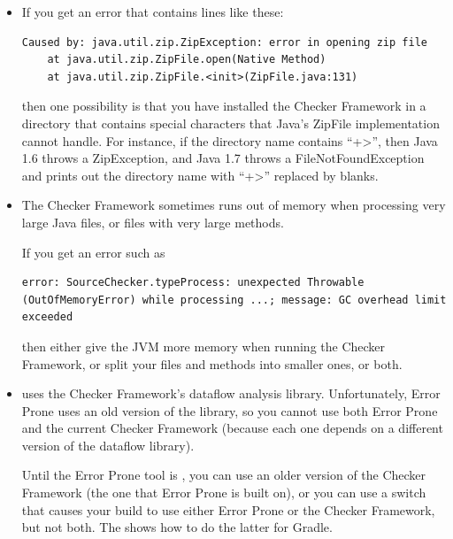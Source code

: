 \begin{itemize}
If you are building from source (Section~\ref{build-source}),
you might need to rebuild the Annotation
File Utilities before recompiling or using the Checker Framework.


\item
If you get an error that contains lines like these:

\begin{Verbatim}
Caused by: java.util.zip.ZipException: error in opening zip file
    at java.util.zip.ZipFile.open(Native Method)
    at java.util.zip.ZipFile.<init>(ZipFile.java:131)
\end{Verbatim}

\noindent
then one possibility is that you have installed the Checker Framework in a
directory that contains special characters that Java's ZipFile
implementation cannot handle.  For instance, if the directory name contains
``\<+>'', then Java 1.6 throws a ZipException, and Java 1.7 throws a
FileNotFoundException and prints out the directory name with ``\<+>''
replaced by blanks.

\item
The Checker Framework sometimes runs out of memory when processing very
large Java files, or files with very large methods.

If you get an error such as
\begin{Verbatim}
error: SourceChecker.typeProcess: unexpected Throwable (OutOfMemoryError) while processing ...; message: GC overhead limit exceeded
\end{Verbatim}

\noindent
then either give the JVM more memory when running the Checker Framework, or
split your files and methods into smaller ones, or both.

\item
{} uses the Checker Framework's
dataflow analysis library.
Unfortunately, Error Prone uses an old version of the library, so you
cannot use both Error Prone and the current Checker Framework (because each
one depends on a different version of the dataflow library).

Until the Error Prone tool is ,
you can use an older version of the Checker Framework (the one that Error
Prone is built on), or you can use a switch that causes your build to use either
Error Prone or the Checker Framework, but not both.
The
 shows how to do the latter for Gradle.

\end{itemize}


